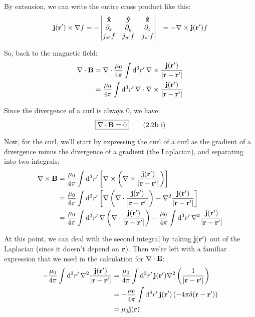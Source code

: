 \documentclass{article}
\begin{document}
By extension, we can write the entire cross product like this:
\[
\begin{aligned}
	\vb{j}(\vb{r'})\times\nabla f &= -
	\begin{vmatrix*}[c]
	\vu{x} & \vu{y} & \vu{z} \\
	\partial_x & \partial_y & \partial_z \\
	j_{x'}f & j_{y'}f & j_{z'}f \\
	\end{vmatrix*} 
	&= -\nabla\times \vb{j}(\vb{r'})f
\end{aligned}
\]


So, back to the magnetic field:
\[
\begin{aligned}
	\nabla\cdot\vb{B} &= \nabla\cdot\frac{\mu _0}{4\pi}\int\dd[3]{r'}\nabla\times\frac{\vb{j}(\vb{r'})}{\left|\vb{r}-\vb{r'}\right|} \\
	&= \frac{\mu _0}{4\pi}\int\dd[3]{r'}\nabla\cdot\nabla\times\frac{\vb{j}(\vb{r'})}{\left|\vb{r}-\vb{r'}\right|}
\end{aligned}
\]


Since the divergence of a curl is always $0$, we have:
\begin{equation}
	\boxed{\nabla\cdot\vb{B} = 0}\tag{2.2b i}\label{eq:2.2b1}
\end{equation}

Now, for the curl, we'll start by expressing the curl of a curl as the gradient of a divergence minus the divergence of a gradient (the Laplacian), and separating into two integrals:
\[
\begin{aligned}
	\nabla\times\vb{B} &= \frac{\mu _0}{4\pi}\int\dd[3]{r'}\left[\nabla\times\left(\nabla\times\frac{\vb{j}(\vb{r'})}{\left|\vb{r}-\vb{r'}\right|}\right)\right] \\
	&= \frac{\mu _0}{4\pi}\int\dd[3]{r'}\left[\nabla\left(\nabla\cdot \frac{\vb{j}(\vb{r'})}{|\vb{r}-\vb{r'}|}\right) - \nabla ^2 \frac{\vb{j}(\vb{r'})}{|\vb{r}-\vb{r'}|}\right] \\
	&= \frac{\mu _0}{4\pi}\int\dd[3]{r'}\nabla\left(\nabla\cdot \frac{\vb{j}(\vb{r'})}{|\vb{r}-\vb{r'}|}\right) - \frac{\mu _0}{4\pi}\int\dd[3]{r'}\nabla ^2 \frac{\vb{j}(\vb{r'})}{|\vb{r}-\vb{r'}|}
\end{aligned}
\]


At this point, we can deal with the second integral by taking $\vb{j}(\vb{r'})$ out of the Laplacian (since it doesn't depend on $\vb{r}$). Then we're left with a familiar expression that we used in the calculation for $\nabla\cdot\vb{E}$:
\[
\begin{aligned}
	- \frac{\mu _0}{4\pi}\int\dd[3]{r'}\nabla ^2 \frac{\vb{j}(\vb{r'})}{|\vb{r}-\vb{r'}|} &= \frac{\mu _0}{4\pi}\int\dd[3]{r'}\vb{j}(\vb{r'})\nabla ^2 \left(\frac{1}{|\vb{r}-\vb{r'}|}\right) \\
	&= - \frac{\mu _0}{4\pi}\int\dd[3]{r'}\vb{j}(\vb{r'})\left(-4\pi\delta(\vb{r}-\vb{r'})\right) \\
	&= \mu _0 \vb{j}(\vb{r})
\end{aligned}
\]
\end{document}
